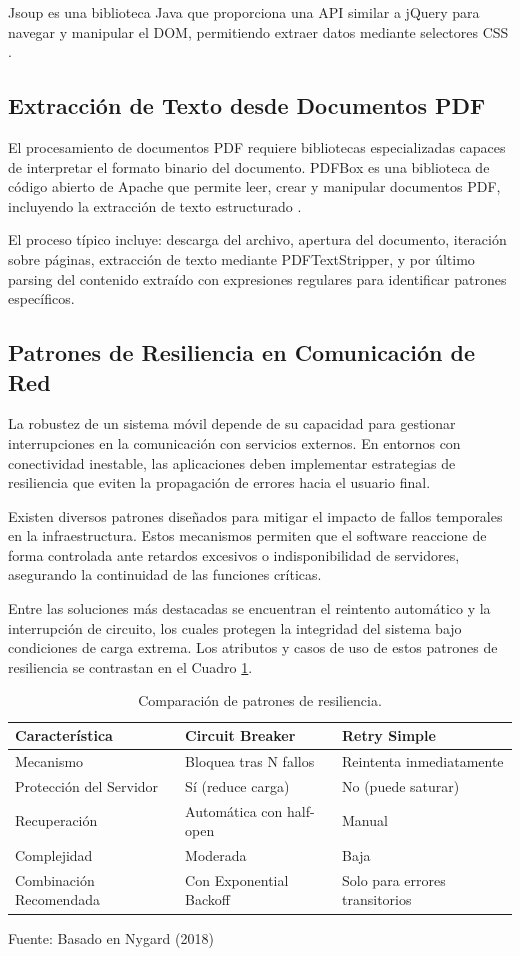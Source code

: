 Jsoup es una biblioteca Java que proporciona una API similar a jQuery para navegar y manipular el DOM, permitiendo extraer datos mediante selectores CSS \cite{jsoup_docs}.

\subsection{Extracción de Texto desde Documentos PDF}
El procesamiento de documentos PDF requiere bibliotecas especializadas capaces de interpretar el formato binario del documento. PDFBox es una biblioteca de código abierto de Apache que permite leer, crear y manipular documentos PDF, incluyendo la extracción de texto estructurado \cite{pdfbox_docs}.

El proceso típico incluye: descarga del archivo, apertura del documento, iteración sobre páginas, extracción de texto mediante PDFTextStripper, y por último parsing del contenido extraído con expresiones regulares para identificar patrones específicos.

\subsection{Patrones de Resiliencia en Comunicación de Red}
La robustez de un sistema móvil depende de su capacidad para gestionar interrupciones en la comunicación con servicios externos. En entornos con conectividad inestable, las aplicaciones deben implementar estrategias de resiliencia que eviten la propagación de errores hacia el usuario final.

Existen diversos patrones diseñados para mitigar el impacto de fallos temporales en la infraestructura. Estos mecanismos permiten que el software reaccione de forma controlada ante retardos excesivos o indisponibilidad de servidores, asegurando la continuidad de las funciones críticas.

Entre las soluciones más destacadas se encuentran el reintento automático y la interrupción de circuito, los cuales protegen la integridad del sistema bajo condiciones de carga extrema. Los atributos y casos de uso de estos patrones de resiliencia se contrastan en el Cuadro \ref{tab:resilience_comparison}.

\begin{table}[H]
\centering
\begin{tabularx}{\linewidth}{p{3.5cm} p{4.5cm} p{4.5cm}}
\toprule
Característica & Circuit Breaker & Retry Simple \\
\midrule
Mecanismo & Bloquea tras N fallos & Reintenta inmediatamente \\
Protección del Servidor & Sí (reduce carga) & No (puede saturar) \\
Recuperación & Automática con half-open & Manual \\
Complejidad & Moderada & Baja \\
Combinación Recomendada & Con Exponential Backoff & Solo para errores transitorios \\
\bottomrule
\end{tabularx}
\caption{Comparación de patrones de resiliencia.}\label{tab:resilience_comparison}
Fuente: Basado en Nygard (2018) \cite{nygard2018release}
\end{table}

